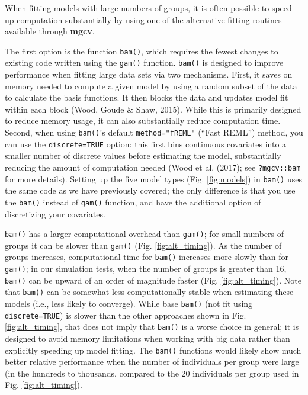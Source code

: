 \documentclass[12pt]{article}
\begin{document}
When fitting models with large numbers of groups, it is often possible
to speed up computation substantially by using one of the alternative
fitting routines available through \textbf{mgcv}.

The first option is the function \texttt{bam()}, which requires the
fewest changes to existing code written using the \texttt{gam()}
function. \texttt{bam()} is designed to improve performance when fitting
large data sets via two mechanisms. First, it saves on memory needed to
compute a given model by using a random subset of the data to calculate
the basis functions. It then blocks the data and updates model fit
within each block (Wood, Goude \& Shaw, 2015). While this is primarily
designed to reduce memory usage, it can also substantially reduce
computation time. Second, when using \texttt{bam()}'s default
\texttt{method="fREML"} (``Fast REML'') method, you can use the
\texttt{discrete=TRUE} option: this first bins continuous covariates
into a smaller number of discrete values before estimating the model,
substantially reducing the amount of computation needed (Wood et al.
(2017); see \texttt{?mgcv::bam} for more details). Setting up the five
model types (Fig. \ref{fig:models}) in \texttt{bam()} uses the same code
as we have previously covered; the only difference is that you use the
\texttt{bam()} instead of \texttt{gam()} function, and have the
additional option of discretizing your covariates.

\texttt{bam()} has a larger computational overhead than \texttt{gam()};
for small numbers of groups it can be slower than \texttt{gam()} (Fig.
\ref{fig:alt_timing}). As the number of groups increases, computational
time for \texttt{bam()} increases more slowly than for \texttt{gam()};
in our simulation tests, when the number of groups is greater than 16,
\texttt{bam()} can be upward of an order of magnitude faster (Fig.
\ref{fig:alt_timing}). Note that \texttt{bam()} can be somewhat less
computationally stable when estimating these models (i.e., less likely
to converge). While base \texttt{bam()} (not fit using
\texttt{discrete=TRUE}) is slower than the other approaches shown in
Fig. \ref{fig:alt_timing}, that does not imply that \texttt{bam()} is a
worse choice in general; it is designed to avoid memory limitations when
working with big data rather than explicitly speeding up model fitting.
The \texttt{bam()} functions would likely show much better relative
performance when the number of individuals per group were large (in the
hundreds to thousands, compared to the 20 individuals per group used in
Fig. \ref{fig:alt_timing}).
\end{document}
